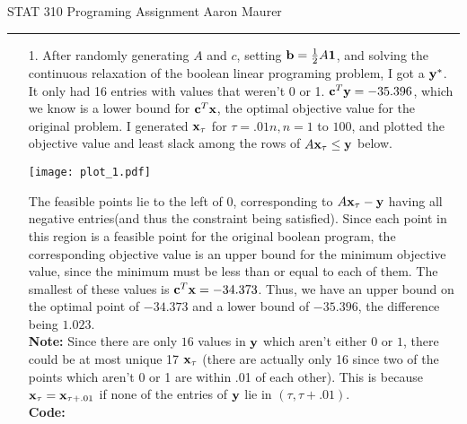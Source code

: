\documentclass[11pt]{article}
\theoremstyle{definition}
\begin{document}
STAT 310 Programing Assignment \hfill Aaron Maurer
\vspace{2mm}
\hrule
\vspace{2mm}

\begin{itemize}
    \item[1.]
        After randomly generating $A$ and $c$, setting \({\bf b}=\frac{1}{2}A{\bf 1}\), and solving the continuous relaxation of the boolean linear programing problem, I got a \({\bf y}^*\). It only had 16 entries with values that weren't 0 or 1. \({\bf c}^T{\bf y}=-35.396\), which we know is a lower bound for \({\bf c}^T{\bf x}\), the optimal objective value for the original problem. I generated ${\bf x}_\tau$ for $\tau = .01n, n=1$ to $100$, and plotted the objective value and least slack among the rows of $A{\bf x}_\tau\leq{\bf y}$ below. 
        \begin{center}
            \texttt{[image: plot\_1.pdf]}
        \end{center}
        The feasible points lie to the left of $0$, corresponding to $A{\bf x}_\tau-{\bf y}$ having all negative entries(and thus the constraint being satisfied). Since each point in this region is a feasible point for the original boolean program, the corresponding objective value is an upper bound for the minimum objective value, since the minimum must be less than or equal to each of them. The smallest of these values is ${\bf c}^T{\bf x}=-34.373$. Thus, we have an upper bound on the optimal point of $-34.373$ and a lower bound of $-35.396$, the difference being $1.023$. \\

{\bf Note:} Since there are only $16$ values in ${\bf y}$ which aren't either $0$ or $1$, there could be at most unique 17 ${\bf x}_\tau$ (there are actually only 16 since two of the points which aren't 0 or 1 are within .01 of each other). This is because ${\bf x}_\tau = {\bf x}_{\tau+.01}$ if none of the entries of ${\bf y}$ lie in $(\tau,\tau+.01)$. \\

        {\bf Code:} \\
        


\end{itemize}
\end{document}
